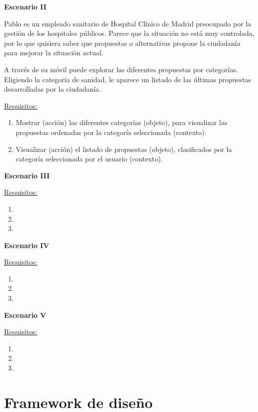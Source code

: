 \textbf{Escenario II}

Pablo es un empleado sanitario de Hospital Clínico de Madrid preocupado por la gestión de los hospitales públicos. Parece que la situación no está muy controlada, por lo que quisiera saber que propuestas o alternativas propone la ciudadanía para mejorar la situación actual.

A través de su móvil puede explorar las diferentes propuestas por categorías. Eligiendo la categoría de sanidad, le aparece un listado de las últimas propuestas desarrolladas por la ciudadanía.

\underline{Requisitos:}

\begin{enumerate}
\item Mostrar (acción) las diferentes categorías (objeto), para visualizar las propuestas ordenadas por la categoría seleccionada (contexto).
\item Visualizar (acción) el listado de propuestas (objeto), clasificados por la categoría seleccionada por el usuario (contexto).
\end{enumerate}

\textbf{Escenario III}

\underline{Requisitos:}

\begin{enumerate}
\item
\item
\item
\end{enumerate}

\textbf{Escenario IV}

\underline{Requisitos:}

\begin{enumerate}
\item
\item
\item
\end{enumerate}

\textbf{Escenario V}

\underline{Requisitos:}

\begin{enumerate}
\item
\item
\item
\end{enumerate}

\section{Framework de diseño}

